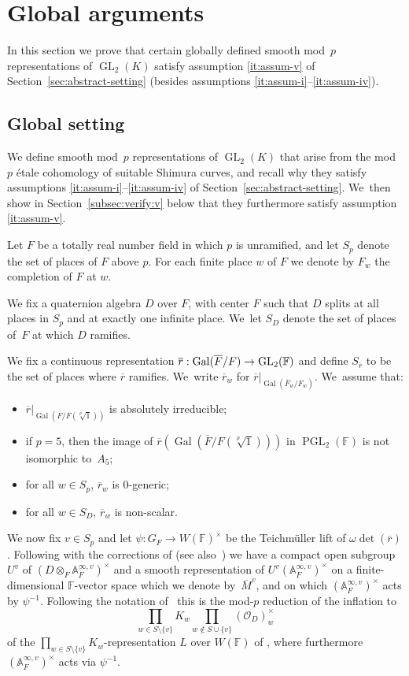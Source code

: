 \documentclass[JEP,XML,SOM,Unicode,NoFloatCountersInSection, NoEqCountersInSection,published]{cedram}
\let\ovl\overline
\newcommand{\F}{\mathbb{F}}
\newcommand{\cO}{\mathcal{O}}
\newcommand{\rbar}{\overline{r}}
\newcommand{\s}{^\times}
\DeclareMathOperator{\Gal}{Gal}
\DeclareMathOperator{\GL}{GL}
\DeclareMathOperator{\PGL}{PGL}
\theoremstyle{plain}
\theoremstyle{definition}
\begin{document}
\section{Global arguments}
\label{sec:global-arg}

In this section we prove that certain globally defined smooth mod~$p$ representations of $\GL_2(K)$ satisfy assumption \eqref{it:assum-v} of Section~\ref{sec:abstract-setting} (besides assumptions \eqref{it:assum-i}--\eqref{it:assum-iv}).

\subsection{Global setting}
\label{sec:global:setting}

We define smooth mod~$p$ representations of $\GL_2(K)$ that arise from the mod~$p$ étale cohomology of suitable Shimura curves, and recall why they satisfy assumptions \eqref{it:assum-i}--\eqref{it:assum-iv} of Section~\ref{sec:abstract-setting}. We~then show in Section~\ref{subsec:verify:v} below that they furthermore satisfy assumption \eqref{it:assum-v}.

Let $F$ be a totally real number field in which $p$ is unramified, and let $S_p$ denote the set of places of $F$ above $p$.
For each finite place $w$ of $F$ we denote by $F_w$ the completion of $F$ at $w$.

We fix a quaternion algebra $D$ over $F$, with center $F$ such that $D$ splits at all places in $S_p$ and at exactly one infinite place. We~let $S_D$ denote the set of places of~$F$ at which $D$ ramifies.

We fix a continuous representation $\rbar:\Gal(\ovl{F}/F)\ra\GL_2(\F)$ and define $S_{\rbar}$ to be the set of places where $\rbar$ ramifies. We~write $\rbar_w$ for $\rbar|_{\Gal(\ovl{F}_w/F_w)}$. We~assume that:
\begin{itemize}
\item $\rbar|_{\Gal(\ovl{F}/F(\sqrt[p]{1}))}$ is absolutely irreducible;
\item if $p\!=\!5$, then the image of $\rbar(\Gal(\ovl{F}/F(\sqrt[p]{1})))$ in $\PGL_2(\F)$ is not isomorphic to~$A_5$;
\item for all $w\in S_p$, $\rbar_w$ is $0$-generic;
\item for all $w\in S_D$, $\rbar_w$ is non-scalar.
\end{itemize}
We now fix $v\in S_p$ {and let $\psi: G_F \to W(\F)\s$ be the Teichmüller lift of $\omega \det(\rbar)$}.
Following \cite[\S 6.5]{EGS} with the corrections of \cite[Rem.\,8.1.3]{BHHMS1} (see also~\cite[\S 3.3, \S 3.4]{BD}) we have a compact open subgroup $U^v$ of $(D\otimes_F\mathbb{A}_F^{\infty,v})^\times$ and a smooth representation of $U^v(\mathbb{A}_F^{\infty,v})^\times$ on a finite-dimensional $\F$-vector space which we denote by~$\ovl{M}^v$, and on which $(\mathbb{A}_F^{\infty,v})^\times$ acts by $\psi^{-1}$.
Following the notation of \cite[\S 6.5]{EGS}~this is the mod-$p$ reduction of the inflation to
\[
\prod_{w\in S\setminus\{v\}}K_w\prod_{w\notin S\cup\{v\}}(\cO_{D})^\times_w
\]
of the $\prod_{w\in S\setminus\{v\}}K_w$-representation $L$ over $W(\F)$ of \loccit, where furthermore $(\mathbb{A}_F^{\infty,v})^\times$ acts via $\psi^{-1}$.
\end{document}
